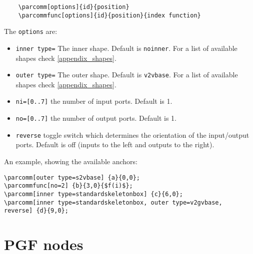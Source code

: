 \documentclass[10pt]{article}
\begin{document}
\begin{verbatim}
	\parcomm[options]{id}{position}
	\parcommfunc[options]{id}{position}{index function}
\end{verbatim}

The \texttt{options} are:
\begin{itemize}
\item \texttt{inner type=} The inner shape. Default is \texttt{noinner}. For a list of available shapes check \autoref{appendix_shapes}.
\item \texttt{outer type=} The outer shape. Default is \texttt{v2vbase}. For a list of available shapes check \autoref{appendix_shapes}.
\item \texttt{ni=[0..7]} the number of input ports. Default is 1.
\item \texttt{no=[0..7]} the number of output ports. Default is 1.
\item\texttt{reverse} toggle switch which determines the orientation of the input/output ports. Default is off (inputs to the left and outputs to the right).
\end{itemize}

An example, showing the available anchors:
\begin{verbatim}
\parcomm[outer type=s2vbase] {a}{0,0};
\parcommfunc[no=2] {b}{3,0}{$f(i)$};
\parcomm[inner type=standardskeletonbox] {c}{6,0};
\parcomm[inner type=standardskeletonbox, outer type=v2gvbase, 
reverse] {d}{9,0};
\end{verbatim}

\begin{figure}[htb!]\centering
{}
\end{figure}

\newpage
\appendix
\section{PGF nodes} \label{appendix_shapes}
\end{document}
